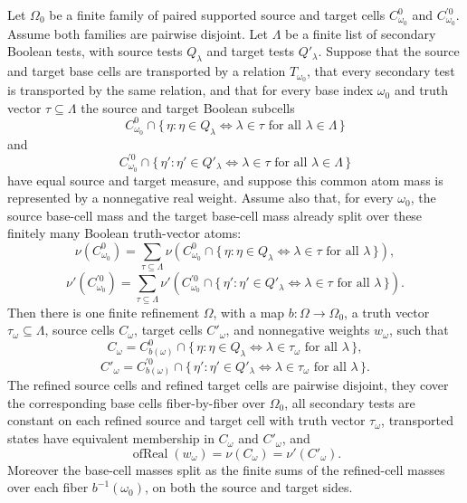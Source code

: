 \begin{helper}
Let \(\Omega_0\) be a finite family of paired supported source and target
cells \(C^0_{\omega_0}\) and \(C^{\prime 0}_{\omega_0}\).  Assume both
families are pairwise disjoint.  Let \(\Lambda\) be a finite list of secondary
Boolean tests, with source tests \(Q_\lambda\) and target tests
\(Q'_\lambda\).  Suppose that the source and target base cells are transported
by a relation \(T_{\omega_0}\), that every secondary test is transported by
the same relation, and that for every base index \(\omega_0\) and truth vector
\(\tau\subseteq\Lambda\) the source and target Boolean subcells
\[
C^0_{\omega_0}\cap
  \{\,\eta: \eta\in Q_\lambda \Longleftrightarrow \lambda\in\tau
       \text{ for all }\lambda\in\Lambda\,\}
\]
and
\[
C^{\prime 0}_{\omega_0}\cap
  \{\,\eta': \eta'\in Q'_\lambda \Longleftrightarrow \lambda\in\tau
       \text{ for all }\lambda\in\Lambda\,\}
\]
have equal source and target measure, and suppose this common atom mass is
represented by a nonnegative real weight.  Assume also that, for every
\(\omega_0\), the source base-cell mass and the target base-cell mass already
split over these finitely many Boolean truth-vector atoms:
\[
\nu(C^0_{\omega_0})
=\sum_{\tau\subseteq\Lambda}
  \nu\!\left(C^0_{\omega_0}\cap
  \{\,\eta: \eta\in Q_\lambda \Longleftrightarrow \lambda\in\tau
       \text{ for all }\lambda\,\}\right),
\]
\[
\nu'(C^{\prime0}_{\omega_0})
=\sum_{\tau\subseteq\Lambda}
  \nu'\!\left(C^{\prime0}_{\omega_0}\cap
  \{\,\eta': \eta'\in Q'_\lambda \Longleftrightarrow \lambda\in\tau
       \text{ for all }\lambda\,\}\right).
\]
Then there is one finite refinement
\(\Omega\), with a map \(b:\Omega\to\Omega_0\), a truth vector
\(\tau_\omega\subseteq\Lambda\), source cells \(C_\omega\), target cells
\(C'_\omega\), and nonnegative weights \(w_\omega\), such that
\[
C_\omega=C^0_{b(\omega)}\cap
  \{\,\eta: \eta\in Q_\lambda \Longleftrightarrow \lambda\in\tau_\omega
       \text{ for all }\lambda\,\},
\]
\[
C'_\omega=C^{\prime 0}_{b(\omega)}\cap
  \{\,\eta': \eta'\in Q'_\lambda \Longleftrightarrow \lambda\in\tau_\omega
       \text{ for all }\lambda\,\}.
\]
The refined source cells and refined target cells are pairwise disjoint, they
cover the corresponding base cells fiber-by-fiber over \(\Omega_0\), all
secondary tests are constant on each refined source and target cell with
truth vector \(\tau_\omega\), transported states have equivalent membership in
\(C_\omega\) and \(C'_\omega\), and
\[
\operatorname{ofReal}(w_\omega)=\nu(C_\omega)=\nu'(C'_\omega).
\]
Moreover the base-cell masses split as the finite sums of the refined-cell
masses over each fiber \(b^{-1}(\omega_0)\), on both the source and target
sides.
\end{helper}
